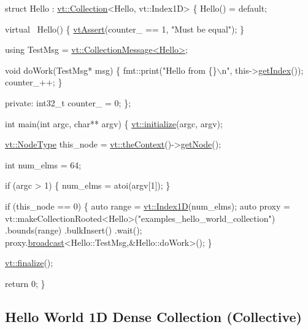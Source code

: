 \begin{DoxyCodeInclude}
\textcolor{keyword}{struct }Hello : \hyperlink{structvt_1_1vrt_1_1collection_1_1_collection}{vt::Collection}<Hello, vt::Index1D> \{
  Hello() = \textcolor{keywordflow}{default};

  \textcolor{keyword}{virtual} ~Hello() \{
    \hyperlink{config__assert_8h_aeddd4990a496e91a0ca5d6c16437359b}{vtAssert}(counter\_ == 1, \textcolor{stringliteral}{"Must be equal"});
  \}

  \textcolor{keyword}{using} TestMsg = \hyperlink{structvt_1_1vrt_1_1collection_1_1_collection_message}{vt::CollectionMessage<Hello>};

  \textcolor{keywordtype}{void} doWork(TestMsg* msg) \{
    fmt::print(\textcolor{stringliteral}{"Hello from \{\}\(\backslash\)n"}, this->\hyperlink{structvt_1_1vrt_1_1collection_1_1_indexable_a28d05f23e7a20e12e94b8235305c1e82}{getIndex}());
    counter\_++;
  \}

\textcolor{keyword}{private}:
  int32\_t counter\_ = 0;
\};

\textcolor{keywordtype}{int} main(\textcolor{keywordtype}{int} argc, \textcolor{keywordtype}{char}** argv) \{
  \hyperlink{namespacevt_aae6ab5af3e11886ce73c4c3ffa008201}{vt::initialize}(argc, argv);

  \hyperlink{namespacevt_a866da9d0efc19c0a1ce79e9e492f47e2}{vt::NodeType} this\_node = \hyperlink{namespacevt_a26551fe0e6e6a1371111df5b12c7e92c}{vt::theContext}()->\hyperlink{structvt_1_1ctx_1_1_context_a0d52c263ce8516546a67443d9a86fa5f}{getNode}();

  \textcolor{keywordtype}{int} num\_elms = 64;

  \textcolor{keywordflow}{if} (argc > 1) \{
    num\_elms = atoi(argv[1]);
  \}

  \textcolor{keywordflow}{if} (this\_node == 0) \{
    \textcolor{keyword}{auto} range = \hyperlink{namespacevt_a5540efc78234273e1796fb003fe4d234}{vt::Index1D}(num\_elms);
    \textcolor{keyword}{auto} proxy = vt::makeCollectionRooted<Hello>(\textcolor{stringliteral}{"examples\_hello\_world\_collection"})
      .bounds(range)
      .bulkInsert()
      .wait();
    proxy.\hyperlink{structvt_1_1objgroup_1_1proxy_1_1_proxy_a0b716ca776b1f06e0d7d45afbe9e5274}{broadcast}<Hello::TestMsg,&Hello::doWork>();
  \}

  \hyperlink{namespacevt_a540d90dbd6e97b69f1dcbc9ee9314cff}{vt::finalize}();

  \textcolor{keywordflow}{return} 0;
\}
\end{DoxyCodeInclude}
 \hypertarget{collection_collective-hello-world-collection}{}\subsection{Hello World 1\+D Dense Collection (\+Collective)}\label{collection_collective-hello-world-collection}

